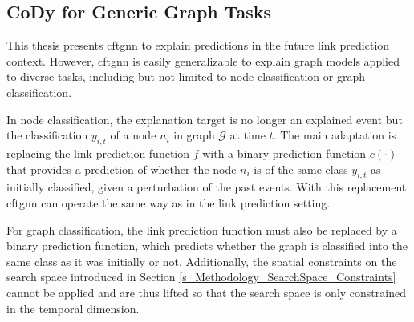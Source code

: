 \FloatBarrier
\subsection{CoDy for Generic Graph Tasks}
\label{s_Methodology_GenericGraphTasks}
This thesis presents \gls{cftgnn} to explain predictions in the future link prediction context. However, \gls{cftgnn} is easily generalizable to explain graph models applied to diverse tasks, including but not limited to node classification or graph classification.

In node classification, the explanation target is no longer an explained event but the classification $y_{i, t}$ of a node $n_i$ in graph $\mathcal{G}$ at time $t$. The main adaptation is replacing the link prediction function $f$ with a binary prediction function $c(\cdot)$ that provides a prediction of whether the node $n_i$ is of the same class $y_{i, t}$ as initially classified, given a perturbation of the past events. With this replacement \gls{cftgnn} can operate the same way as in the link prediction setting.

For graph classification, the link prediction function must also be replaced by a binary prediction function, which predicts whether the graph is classified into the same class as it was initially or not. Additionally, the spatial constraints on the search space introduced in Section \ref{s_Methodology_SearchSpace_Constraints} cannot be applied and are thus lifted so that the search space is only constrained in the temporal dimension.
